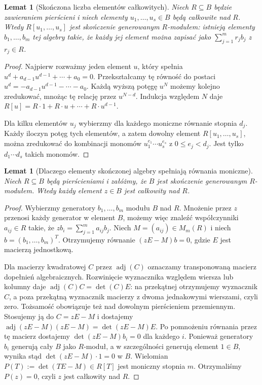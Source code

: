 \documentclass[11pt,a4paper,openany]{report}
\numberwithin{equation}{section}
\theoremstyle{plain}
\newtheorem{lemat}[twierdzenie]{Lemat}
\theoremstyle{definition}
\theoremstyle{remark}
\begin{document}
\begin{lemat}[Skończona liczba elementów całkowitych]
\label{lem:integral-finite}
Niech $R\subseteq B$ będzie zawieraniem pierścieni i niech
elementy $u_1,\dots,u_s\in B$ będą całkowite nad $R$.
Wtedy $R[u_1,\dots,u_s]$ jest skończenie generowanym
$R$-modułem: istnieją elementy $b_1,\dots,b_m$
tej algebry takie, że każdy jej element można zapisać jako
$\sum_{j=1}^m r_jb_j$ z $r_j\in R$.
\end{lemat}
\begin{proof}
Najpierw rozważmy jeden element $u$, który spełnia
$u^d+a_{d-1}u^{d-1}+\cdots+a_0=0$.
Przekształcamy tę równość do postaci
$u^d=-a_{d-1}u^{d-1}-\cdots-a_0$.
Każdą wyższą potęgę $u^N$ możemy kolejno zredukować,
mnożąc tę relację przez $u^{N-d}$. Indukcja względem $N$
daje $R[u]=R\cdot1+R\cdot u+\cdots+R\cdot u^{d-1}$.

Dla kilku elementów $u_j$ wybierzmy dla każdego moniczne
równanie stopnia $d_j$. Każdy iloczyn potęg tych elementów,
a zatem dowolny element $R[u_1,\dots,u_s]$,
można zredukować do kombinacji monomów
$u_1^{e_1}\cdots u_s^{e_s}$ z $0\le e_j<d_j$.
Jest tylko $d_1\cdots d_s$ takich monomów.
\end{proof}

\begin{lemat}[Dlaczego elementy skończonej algebry spełniają równania moniczne]
\label{lem:determinant-integral}
Niech $R\subseteq B$ będą pierścieniami i załóżmy, że $B$
jest skończenie generowanym $R$-modułem. Wtedy każdy element
$z\in B$ jest całkowity nad $R$.
\end{lemat}
\begin{proof}
Wybierzmy generatory $b_1,\dots,b_m$ modułu $B$ nad $R$.
Mnożenie przez $z$ przenosi każdy generator w element $B$,
możemy więc znaleźć współczynniki $a_{ij}\in R$ takie, że
$zb_i=\sum_{j=1}^m a_{ij}b_j$.
Niech $M=(a_{ij})\in M_m(R)$ i niech
$b=(b_1,\dots,b_m)^T$. Otrzymujemy równanie
$(zE-M)b=0$, gdzie $E$ jest macierzą jednostkową.

Dla macierzy kwadratowej $C$ przez $\operatorname{adj}(C)$
oznaczamy transponowaną macierz dopełnień algebraicznych.
Rozwinięcie wyznacznika względem wiersza lub kolumny daje
$\operatorname{adj}(C)C=\det(C)E$: na przekątnej otrzymujemy
wyznacznik $C$, a poza przekątną wyznacznik macierzy
z dwoma jednakowymi wierszami, czyli zero.
Tożsamość obowiązuje też nad dowolnym pierścieniem przemiennym.
Stosujemy ją do $C=zE-M$ i dostajemy
$\operatorname{adj}(zE-M)(zE-M)=\det(zE-M)E$.
Po pomnożeniu równania przez tę macierz dostajemy
$\det(zE-M)b_i=0$ dla każdego $i$.
Ponieważ generatory $b_i$ generują cały $B$ jako $R$-moduł,
a w szczególności generują element $1\in B$,
wynika stąd $\det(zE-M)\cdot1=0$ w $B$.
Wielomian $P(T):=\det(TE-M)\in R[T]$ jest moniczny
stopnia $m$. Otrzymaliśmy $P(z)=0$, czyli $z$ jest całkowity nad $R$.
\end{proof}
\end{document}
